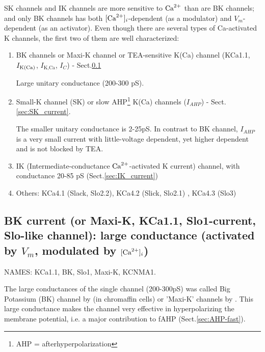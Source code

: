 SK channels and IK channels are more sensitive to ${\text{Ca}^{2+}}$ than are BK channels;
and only BK channels has both $[{\text{Ca}^{2+}}]_i$-dependent (as a modulator) and
$V_m$-dependent (as an activator). Even though there are several types of
Ca-activated K channels, the first two of them are well characterized:
\begin{enumerate}
  
  \item BK channels or Maxi-K channel or TEA-sensitive K(Ca) channel
  (KCa1.1, $I_{\ce{K(Ca)}}$, $I_\text{K,Ca}$, $I_C$) -
  Sect.\ref{sec:MaxiK-current}
  
  Large unitary conductance (200-300 pS).
  
  \item Small-K channel (SK) or slow AHP\footnote{AHP = afterhyperpolarization}
  K(Ca) channels ($I_{AHP}$) - Sect.\ref{sec:SK_current}. 
  
  The smaller unitary conductance is 2-25pS. In contrast to BK channel,
  $I_{AHP}$ is a very small current with little-voltage dependent, yet higher
   dependent and is not blocked by TEA.
  
  \item IK (Intermediate-conductance ${\text{Ca}^{2+}}$-activated
  K current)  channel, with conductance 20-85 pS 
  (Sect.\ref{sec:IK_current})
  

  \item Others: KCa4.1 (Slack, Slo2.2), KCa4.2 (Slick, Slo2.1) , KCa4.3 (Slo3)
\end{enumerate}




\subsection{BK current (or Maxi-K, KCa1.1, Slo1-current, Slo-like channel):
large conductance (activated by $V_m$, modulated by $[{\text{Ca}^{2+}}]_i$)}
\label{sec:MaxiK-current}
\label{sec:BK-current}
\label{sec:SLO-channel}

NAMES: KCa1.1, BK, Slo1, Maxi-K, KCNMA1.

The large conductances of the single channel (200-300pS) was called Big
Potassium (BK) channel by \citep{marty1983} (in chromaffin cells) or 'Maxi-K'
channels by \citep{latorre1983}. This large conductance makes the channel very
effective in hyperpolarizing the membrane potential, i.e. a major contribution
to fAHP (Sect.\ref{sec:AHP-fast}). 


